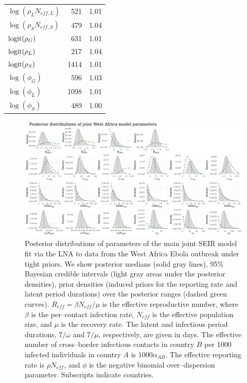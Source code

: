 \begin{table}[htbp]
\begin{tabular}{lrr}
		$ \log(\rho_LN_{eff,L}) $& 521 & 1.01 \\ 
		$ \log(\rho_SN_{eff,S}) $& 479 & 1.04 \\ 
		$ \mathrm{logit}(\rho_G) $& 631 & 1.01 \\ 
		$ \mathrm{logit}(\rho_L) $& 217 & 1.04 \\ 
		$ \mathrm{logit}(\rho_S) $& 1414 & 1.01 \\ 
		$ \log(\phi_G) $& 596 & 1.03 \\ 
		$ \log(\phi_L) $& 1098 & 1.01 \\ 
		$ \log(\phi_S) $& 489 & 1.00 \\ 
		\hline
	\end{tabular}
\end{table}

\begin{figure}
	\begin{fullpage}
		\centering
		\includegraphics[width=\linewidth]{figures/ebola_joint_posts}
		\caption[Posterior distributions of parameters of the main joint SEIR model fit via the LNA to data from the West Africa Ebola outbreak.]{Posterior distributions of parameters of the main joint SEIR model fit via the LNA to data from the West Africa Ebola outbreak under tight priors. We show posterior medians (solid gray lines), 95\% Bayesian credible intervals (light gray areas under the posterior densities), prior densities (induced priors for the reporting rate and latent period durations) over the posterior ranges (dashed green curves). $ R_{eff} = \beta N_{eff}/\mu $ is the effective reproductive number, where $ \beta $ is the per--contact infection rate, $ N_{eff} $ is the effective population size, and $ \mu $ is the recovery rate. The latent and infectious period durations, $ 7/\omega $ and $ 7/\mu $, respectively, are given in days. The effective number of cross--border infectious contacts in country $ B $ per 1000 infected individuals in country $ A $ is $ 1000\alpha_{AB} $. The effective reporting rate is $ \rho N_{eff} $, and $ \phi $ is the negative binomial over--dispersion parameter. Subscripts indicate countries.}
		\label{fig:ebola_joint_posts}
	\end{fullpage}
\end{figure}

